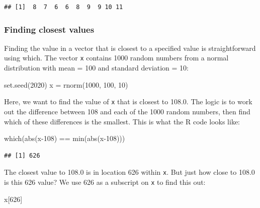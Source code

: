 \documentclass[
]{book}
\newenvironment{Shaded}{\begin{snugshade}}{\end{snugshade}}
\newcommand{\DecValTok}[1]{\textcolor[rgb]{0.00,0.00,0.81}{#1}}
\newcommand{\FunctionTok}[1]{\textcolor[rgb]{0.00,0.00,0.00}{#1}}
\newcommand{\NormalTok}[1]{#1}
\newcommand{\OtherTok}[1]{\textcolor[rgb]{0.56,0.35,0.01}{#1}}
\newcommand{\SpecialCharTok}[1]{\textcolor[rgb]{0.00,0.00,0.00}{#1}}
\begin{document}
\begin{verbatim}
## [1]  8  7  6  6  8  9  9 10 11
\end{verbatim}

\hypertarget{finding-closest-values}{%
\subsubsection{Finding closest values}\label{finding-closest-values}}

Finding the value in a vector that is closest to a specified value is straightforward using which. The vector \texttt{x} contains 1000 random numbers from a normal distribution with mean = 100 and standard deviation = 10:

\begin{Shaded}
\begin{Highlighting}[]
\FunctionTok{set.seed}\NormalTok{(}\DecValTok{2020}\NormalTok{)}
\NormalTok{x }\OtherTok{=} \FunctionTok{rnorm}\NormalTok{(}\DecValTok{1000}\NormalTok{, }\DecValTok{100}\NormalTok{, }\DecValTok{10}\NormalTok{)}
\end{Highlighting}
\end{Shaded}

Here, we want to find the value of \texttt{x} that is closest to 108.0. The logic is to work out the difference between 108 and each of the 1000 random numbers, then find which of these differences is the smallest. This is what the R code looks like:

\begin{Shaded}
\begin{Highlighting}[]
\FunctionTok{which}\NormalTok{(}\FunctionTok{abs}\NormalTok{(x}\DecValTok{{-}108}\NormalTok{) }\SpecialCharTok{==} \FunctionTok{min}\NormalTok{(}\FunctionTok{abs}\NormalTok{(x}\DecValTok{{-}108}\NormalTok{)))}
\end{Highlighting}
\end{Shaded}

\begin{verbatim}
## [1] 626
\end{verbatim}

The closest value to 108.0 is in location 626 within \texttt{x}. But just how close to 108.0 is this 626 value? We use 626 as a subscript on \texttt{x} to find this out:

\begin{Shaded}
\begin{Highlighting}[]
\NormalTok{x[}\DecValTok{626}\NormalTok{]}
\end{Highlighting}
\end{Shaded}
\end{document}
